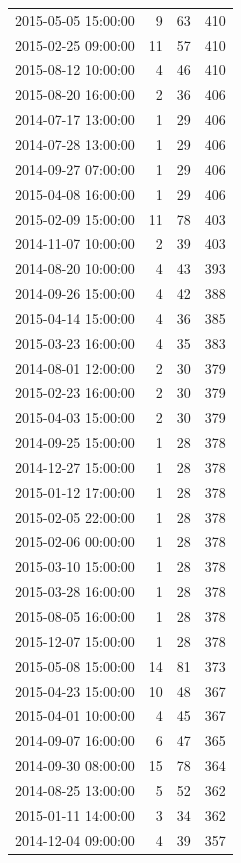 \begin{tabular}{lrrr}
2015-05-05 15:00:00 & 9 & 63 & 410 \\
2015-02-25 09:00:00 & 11 & 57 & 410 \\
2015-08-12 10:00:00 & 4 & 46 & 410 \\
2015-08-20 16:00:00 & 2 & 36 & 406 \\
2014-07-17 13:00:00 & 1 & 29 & 406 \\
2014-07-28 13:00:00 & 1 & 29 & 406 \\
2014-09-27 07:00:00 & 1 & 29 & 406 \\
2015-04-08 16:00:00 & 1 & 29 & 406 \\
2015-02-09 15:00:00 & 11 & 78 & 403 \\
2014-11-07 10:00:00 & 2 & 39 & 403 \\
2014-08-20 10:00:00 & 4 & 43 & 393 \\
2014-09-26 15:00:00 & 4 & 42 & 388 \\
2015-04-14 15:00:00 & 4 & 36 & 385 \\
2015-03-23 16:00:00 & 4 & 35 & 383 \\
2014-08-01 12:00:00 & 2 & 30 & 379 \\
2015-02-23 16:00:00 & 2 & 30 & 379 \\
2015-04-03 15:00:00 & 2 & 30 & 379 \\
2014-09-25 15:00:00 & 1 & 28 & 378 \\
2014-12-27 15:00:00 & 1 & 28 & 378 \\
2015-01-12 17:00:00 & 1 & 28 & 378 \\
2015-02-05 22:00:00 & 1 & 28 & 378 \\
2015-02-06 00:00:00 & 1 & 28 & 378 \\
2015-03-10 15:00:00 & 1 & 28 & 378 \\
2015-03-28 16:00:00 & 1 & 28 & 378 \\
2015-08-05 16:00:00 & 1 & 28 & 378 \\
2015-12-07 15:00:00 & 1 & 28 & 378 \\
2015-05-08 15:00:00 & 14 & 81 & 373 \\
2015-04-23 15:00:00 & 10 & 48 & 367 \\
2015-04-01 10:00:00 & 4 & 45 & 367 \\
2014-09-07 16:00:00 & 6 & 47 & 365 \\
2014-09-30 08:00:00 & 15 & 78 & 364 \\
2014-08-25 13:00:00 & 5 & 52 & 362 \\
2015-01-11 14:00:00 & 3 & 34 & 362 \\
2014-12-04 09:00:00 & 4 & 39 & 357 \\

\end{tabular}
